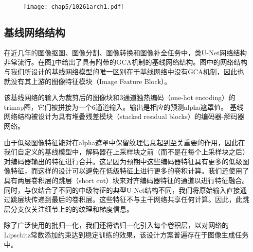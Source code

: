 \begin{figure}[t]
	\centering
	\texttt{[image: chap5/10261arch1.pdf]}
	\label{fig5:arch}
\end{figure}

\subsection{基线网络结构}
在近几年的图像抠图\cite{lutz2018alphagan,samplenet,lu2019indices}、图像分割\cite{long2015fully}、图像转换\cite{isola2017image}和图像补全\cite{liu2018image}任务中，类U-Net网络结构非常流行。在图\ref{fig5:arch}中给出了具有附带的GCA机制的基线网络结构。图中的网络结构与我们所设计的基线网络模型的唯一区别在于基线网络中没有GCA机制，因此也就没有其上游的图像特征模块（Image Feature Block）。

该基线网络的输入为裁剪后的图像块和3通道独热编码（one-hot encoding）的trimap图，它们被拼接为一个6通道输入。输出是相应的预测alpha遮罩值。
基线网络结构被设计为具有堆叠残差模块（stacked residual blocks）\cite{he2016deep}的编码器-解码器网络。

由于低级图像特征能对在alpha遮罩中保留纹理信息起到至关重要的作用，因此在我们自定义的基线模型中，解码器在上采样块之前（而不是在每个上采样块之后）对编码器输出的特征进行合并。这是因为预期中这些编码器特征具有更多的低级图像特征，而这样的设计可以避免在低级特征上进行更多的卷积计算。我们还使用了具有两层卷积层的跳层（short cut）块来对齐编码器特征的通道以进行特征融合。同时，与仅结合了不同的中级特征的典型U-Net结构不同，我们将原始输入直接通过跳层块传递到最后的卷积层。这些特征不与主干网络共享任何计算。因此，此跳层分支仅关注细节上的的纹理和梯度信息。

除了广泛使用的批归一化\cite{ioffe2015batch}，我们还将谱归一化\cite{miyato2018spectral}引入每个卷积层，以对网络的Lipschitz常数添加约束达到稳定训练的效果，该设计方案普遍存在于图像生成任务中\cite{brock2018large,zhang2018self}。


